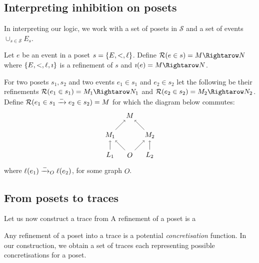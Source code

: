 \subsection{Interpreting inhibition on posets}

In interpreting our logic, we work with a set of posets in $\mathcal{S}$ and a set of events $\cup_{s\in\mathcal{S}} E_s$.

\begin{definition}
  Let $e$ be an event in a poset $s=\{E,<,\ell\}$.
  Define $\mathcal{R}(e\in s) = M\Rightarow N$ where $\{E,<,\ell,\imath\}$ is a refinement of $s$ and $\imath(e) = M\Rightarow N$.
\end{definition}

\begin{definition}
\label{def:ref_neg_infl}
  For two posets $s_1,s_2$ and two events $e_1\in s_1$ and $e_2\in s_2$ let the following be their refinements $\mathcal{R}(e_1\in s_1) = M_1\Rightarow N_1$ and $\mathcal{R}(e_2\in s_2) = M_2\Rightarow N_2$. Define $\mathcal{R}(e_1\in s_1\mathrel{\xrightarrow{-}} e_2\in s_2) = M$ for which the diagram below commutes:
  \[
  \begin{tikzpicture} %
    \node (o) at (0,0) {\(O\)};
    \node (n) at (0,2) {\(M\)};
    \node (l1) at (-1,0) {\(L_1\)};
    \node (l2) at (1,0) {\(L_2\)};
    \node (n1) at (-1,1) {\(M_1\)};
    \node (n2) at (1,1) {\(M_2\)};
    \draw [->] (l1) -- (n1);
    \draw [->] (l2) -- (n2);
    \draw [->] (o) -- (n1);
    \draw [->] (o) -- (n2);
    \draw [->] (n1) -- (n);
    \draw [->] (n2) -- (n);
  \end{tikzpicture}
  \]
  where $\ell(e_1)\mathrel{\xrightarrow{-}}_O\ell(e_2)$, for some graph $O$.
\end{definition}

\subsection{From posets to traces}

Let us now construct a trace from
A refinement of a poset is a

Any refinement of a poset into a trace is a potential \emph{concretisation} function. In our construction, we obtain a set of traces each representing possible concretisations for a poset.

